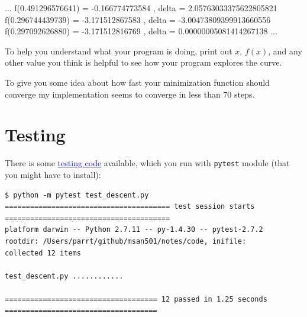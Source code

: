 \documentclass[titlepage]{tufte-book}
\begin{document}
\begin{fullwidth}
\begin{pyverbatim}
...
f(0.491296576641) = -0.166774773584 , delta = 2.05763033375622805821
f(0.296744439739) = -3.171512867583 , delta = -3.00473809399913660556
f(0.297092626880) = -3.171512816769 , delta = 0.00000005081414267138
...
\end{pyverbatim}

To help you understand what your program is doing, print out $x$, $f(x)$, and any other value you think is helpful to see how your program explores the curve.

To give you some idea about  how fast your minimization function should converge my implementation seems to converge in less than 70 steps.

\section{Testing}

There is some \href{https://github.com/parrt/msan501/blob/master/notes/code/test\_descent.py}{\textcolor{blue}{testing code}} available, which you run with {\tt pytest} module (that you might have to install):

\begin{verbatim}
$ python -m pytest test_descent.py 
======================================= test session starts =======================================
platform darwin -- Python 2.7.11 -- py-1.4.30 -- pytest-2.7.2
rootdir: /Users/parrt/github/msan501/notes/code, inifile: 
collected 12 items 

test_descent.py ............

==================================== 12 passed in 1.25 seconds ====================================
\end{verbatim}
 
\end{fullwidth}
\end{document}
